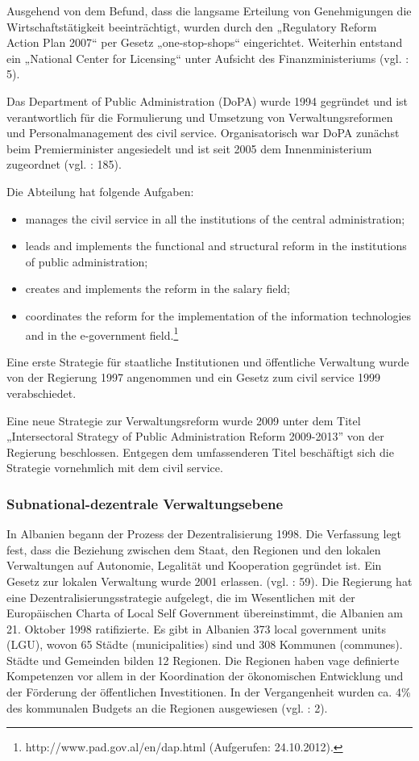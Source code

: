 Ausgehend von dem Befund, dass die langsame Erteilung von Genehmigungen die Wirtschaftstätigkeit beeinträchtigt, wurden durch den „Regulatory Reform Action Plan 2007“ per Gesetz „one-stop-shops“ eingerichtet. Weiterhin entstand ein „National Center for Licensing“ unter Aufsicht des Finanzministeriums (vgl. \cite{oecd08a}: 5).\par
Das Department of Public Administration (DoPA) wurde 1994 gegründet und ist verantwortlich für die Formulierung und Umsetzung von Verwaltungsreformen und Personalmanagement des civil service. Organisatorisch war DoPA zunächst beim Premierminister angesiedelt und ist seit 2005 dem Innenministerium zugeordnet (vgl. \cite{selenica}: 185).\par
Die Abteilung hat folgende Aufgaben:
\begin{itemize} \itemsep1pt \parskip0pt 
\item manages the civil service in all the institutions of the central administration;
\item leads and implements the functional and structural reform in the institutions of public administration;
\item creates and implements the reform in the salary field;
\item coordinates the reform for the implementation of the information technologies and in the e-government field.\footnote{http://www.pad.gov.al/en/dap.html (Aufgerufen: 24.10.2012).}
\end{itemize}
Eine erste Strategie für staatliche Institutionen und öffentliche Verwaltung wurde von der Regierung 1997 angenommen und ein Gesetz zum civil service 1999 verabschiedet.\par
Eine neue Strategie zur Verwaltungsreform wurde 2009 unter dem Titel „Intersectoral Strategy of Public Administration Reform 2009-2013” von der Regierung beschlossen. Entgegen dem umfassenderen Titel beschäftigt sich die Strategie vornehmlich mit dem civil service. 

\subsubsection{Subnational-dezentrale Verwaltungsebene }
In Albanien begann der Prozess der Dezentralisierung 1998. Die Verfassung legt fest, dass die Beziehung zwischen dem Staat, den Regionen und den lokalen Verwaltungen auf Autonomie, Legalität und Kooperation gegründet ist. Ein Gesetz zur lokalen Verwaltung wurde 2001 erlassen. (vgl. \cite{refworld10}: 59). Die Regierung hat eine Dezentralisierungsstrategie aufgelegt, die im Wesentlichen mit der Europäischen Charta of Local Self Government übereinstimmt, die Albanien am 21. Oktober 1998 ratifizierte. Es gibt in Albanien 373 local government units (LGU), wovon 65 Städte (municipalities) sind und 308 Kommunen (communes). Städte und Gemeinden bilden 12 Regionen. Die Regionen haben vage definierte Kompetenzen vor allem in der Koordination der ökonomischen Entwicklung und der Förderung der öffentlichen Investitionen. In der Vergangenheit wurden ca. 4\% des kommunalen Budgets an die Regionen ausgewiesen (vgl. \cite{oecd08a}: 2). \par

